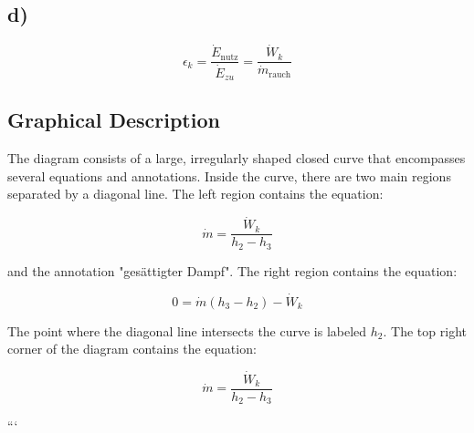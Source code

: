 

\subsection*{d)}

\[
\epsilon_k = \frac{\dot{E}_{\text{nutz}}}{\dot{E}_{zu}} = \frac{\dot{W}_k}{\dot{m}_{\text{rauch}}}
\]

\subsection*{Graphical Description}

The diagram consists of a large, irregularly shaped closed curve that encompasses several equations and annotations. Inside the curve, there are two main regions separated by a diagonal line. The left region contains the equation:

\[
\dot{m} = \frac{\dot{W}_k}{h_2 - h_3}
\]

and the annotation "gesättigter Dampf". The right region contains the equation:

\[
0 = \dot{m} (h_3 - h_2) - \dot{W}_k
\]

The point where the diagonal line intersects the curve is labeled $h_2$. The top right corner of the diagram contains the equation:

\[
\dot{m} = \frac{\dot{W}_k}{h_2 - h_3}
\]

```